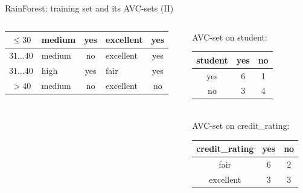 \documentclass[aspectratio=169,t,table]{beamer}
\begin{document}
{\begin{frame}{RainForest: training set and its AVC-sets (II)}
\begin{columns}
\begin{column}{0.6\textwidth}
\begin{tabular}{|c|l|c|l|c|}
            \cellcolor{yellow!20}$\leq30$ & \cellcolor{yellow!20}medium & \cellcolor{yellow!20}yes & \cellcolor{yellow!20}excellent & \cellcolor{green!20}yes \\\hline
            \cellcolor{yellow!20}$31\ldots40$ & \cellcolor{yellow!20}medium & \cellcolor{yellow!20}no & \cellcolor{yellow!20}excellent & \cellcolor{green!20}yes \\\hline
            \cellcolor{yellow!20}$31\ldots40$ & \cellcolor{yellow!20}high & \cellcolor{yellow!20}yes & \cellcolor{yellow!20}fair & \cellcolor{green!20}yes \\\hline
            \cellcolor{yellow!20}$>40$ & \cellcolor{yellow!20}medium & \cellcolor{yellow!20}no & \cellcolor{yellow!20}excellent & \cellcolor{red!20}no \\\hline
          \end{tabular}
        \end{column}
        \begin{column}{0.3\textwidth}
          \vspace{-3cm}

          \centering
          AVC-set on student:\\
          \begin{tabular}{|c|c|c|}
            \hline
            student & yes & no \\\hline
            yes & 6 & 1 \\\hline
            no & 3 & 4 \\\hline
          \end{tabular}\\[1cm]
          AVC-set on credit\_rating:\\
          \begin{tabular}{|c|c|c|}
            \hline
            credit\_rating & yes & no \\\hline
            fair & 6 & 2 \\\hline
            excellent & 3 & 3 \\\hline
          \end{tabular}
        \end{column}
      \end{columns}
    \end{frame}
  }
\end{document}
